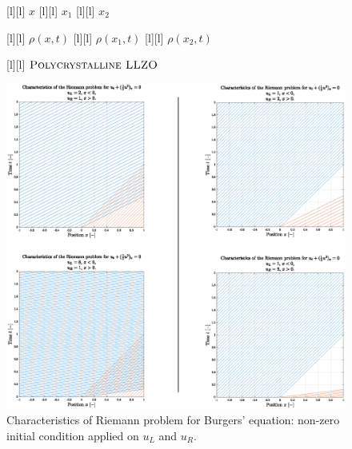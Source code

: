 \begin{figure}[ht]
	\centering
	\footnotesize

	[l] {$x$}
	[l] {$x_1$}
	[l] {$x_2$}

	[l] {$\rho(x,t)$}
	[l] {$\rho(x_{1},t)$}
	[l] {$\rho(x_{2},t)$}


	[l] {$\textsc{Polycrystalline LLZO}$}

	\includegraphics[width=1\textwidth]{charac12182181.eps}
	\caption{Characteristics of Riemann problem for Burgers' equation:
		non-zero initial condition applied on $u_L$ and $u_R$.}
	\label{\LABEL}
\end{figure}
